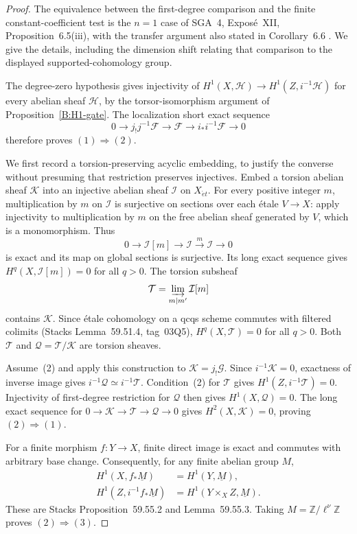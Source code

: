 \begin{proof}
The equivalence between the first-degree comparison and the finite
constant-coefficient test is the $n=1$ case of SGA~4, Expos\'e~XII,
Proposition~6.5(iii), with the transfer argument also stated in
Corollary~6.6 \cite[Expos\'e XII, 6.5--6.6; original pp.~103--111]{BSGA4III1973}. We give the details, including the dimension shift
relating that comparison to the displayed supported-cohomology group.

The degree-zero hypothesis gives injectivity of
$H^1(X,\mathcal H)\to H^1(Z,i^{-1}\mathcal H)$ for every abelian
sheaf $\mathcal H$, by the torsor-isomorphism argument of
Proposition~\ref{B:H1-gate}. The localization short exact sequence
\[
 0\longrightarrow j_!j^{-1}\mathcal F\longrightarrow\mathcal F
 \longrightarrow i_*i^{-1}\mathcal F\longrightarrow0
\]
therefore proves $(1)\Rightarrow(2)$.

We first record a torsion-preserving acyclic embedding, to justify
the converse without presuming that restriction preserves injectives.
Embed a torsion abelian sheaf $\mathcal K$ into an injective abelian
sheaf $\mathcal I$ on $X_{\acute et}$. For every positive integer $m$,
multiplication by $m$ on $\mathcal I$ is surjective on sections over
each \'etale $V\to X$: apply injectivity to multiplication by $m$ on
the free abelian sheaf generated by $V$, which is a monomorphism.
Thus
\[
 0\longrightarrow\mathcal I[m]\longrightarrow\mathcal I
 \xrightarrow{m}\mathcal I\longrightarrow0
\]
is exact and its map on global sections is surjective. Its long exact
sequence gives $H^q(X,\mathcal I[m])=0$ for all $q>0$.
The torsion subsheaf
\[
 \mathcal T=\varinjlim_{m\mid m'}\mathcal I[m]
\]
contains $\mathcal K$. Since \'etale cohomology on a qcqs scheme
commutes with filtered colimits (Stacks Lemma~59.51.4, tag~03Q5),
$H^q(X,\mathcal T)=0$ for all $q>0$. Both $\mathcal T$ and
$\mathcal Q=\mathcal T/\mathcal K$ are torsion sheaves.

Assume~(2) and apply this construction to $\mathcal K=j_!\mathcal G$.
Since $i^{-1}\mathcal K=0$, exactness of inverse image gives
$i^{-1}\mathcal Q\simeq i^{-1}\mathcal T$.
Condition~(2) for $\mathcal T$ gives
$H^1(Z,i^{-1}\mathcal T)=0$. Injectivity of first-degree restriction
for $\mathcal Q$ then gives $H^1(X,\mathcal Q)=0$. The long exact
sequence for $0\to\mathcal K\to\mathcal T\to\mathcal Q\to0$ gives
$H^2(X,\mathcal K)=0$, proving $(2)\Rightarrow(1)$.

For a finite morphism $f:Y\to X$, finite direct image is exact and
commutes with arbitrary base change. Consequently, for any finite
abelian group $M$,
\[
 \begin{aligned}
 H^1(X,f_*\underline M)&=H^1(Y,\underline M),\\
 H^1(Z,i^{-1}f_*\underline M)
 &=H^1(Y\times_X Z,\underline M).
 \end{aligned}
\]
These are Stacks Proposition~59.55.2 and Lemma~59.55.3.
Taking $M=\mathbb Z/\ell^\nu\mathbb Z$ proves $(2)\Rightarrow(3)$.


\end{proof}
